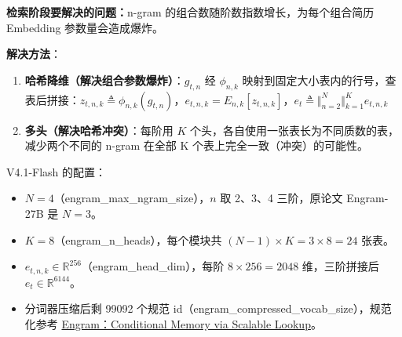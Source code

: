 \documentclass[zihao=false,fontset=windows]{ctexart}
\newcommand{\incode}[1]{\colorbox{inlinebg}{\ttfamily\small #1}}
\begin{document}
\textcolor{feishuRed}{\textbf{检索阶段要解决的问题：}}n-gram 的组合数随阶数指数增长，为每个组合简历 Embedding 参数量会造成爆炸。\par

\textcolor{feishuRed}{\textbf{解决方法}}\textcolor{feishuRed}{：}\par
\begin{enumerate}
\item 
\textbf{哈希降维（解决组合参数爆炸）}：$g_{t,n}$ 经 $\phi_{n,k}$ 映射到固定大小表内的行号，查表后拼接：$z_{t,n,k}\triangleq\phi_{n,k}(g_{t,n})$，$e_{t,n,k}=E_{n,k}[z_{t,n,k}]$，$e_t\triangleq\Vert_{n=2}^{N}\Vert_{k=1}^{K}e_{t,n,k}$\par
\item 
\textbf{多头（解决哈希冲突）}：每阶用 $K$ 个头，各自使用一张表长为不同质数的表，减少两个不同的 n-gram 在全部 K 个表上完全一致（冲突）的可能性。\par
\end{enumerate}

\begin{feishuquote}

V4.1-Flash 的配置：\par
\begin{itemize}
\item 
$N=4$（\incode{engram\_max\_ngram\_size}），$n$ 取 2、3、4 三阶，原论文 Engram-27B 是 $N=3$。\par
\item 
$K=8$（\incode{engram\_n\_heads}），每个模块共 $(N-1)\times K=3\times8=24$ 张表。\par
\item 
$e_{t,n,k}\in\mathbb{R}^{256}$（\incode{engram\_head\_dim}），每阶 $8\times256=2048$ 维，三阶拼接后 $e_t\in\mathbb{R}^{6144}$。\par
\item 
分词器压缩后剩 99092 个规范 id（\incode{engram\_compressed\_vocab\_size}），规范化参考 \href{https://scnajei2ds6y.feishu.cn/wiki/JwXTw0oUeimyoBk2QIgcSfBfn9g}{Engram：Conditional Memory via Scalable Lookup}。\par
\end{itemize}
\end{feishuquote}
\end{document}
